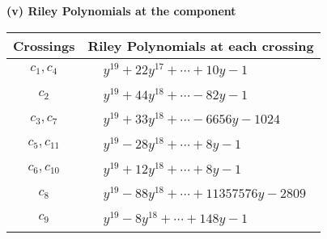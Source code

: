 \documentclass[1p]{elsarticle_modified}
\theoremstyle{definition}
\begin{document}
\newpage\renewcommand{\arraystretch}{1}
\flushleft \textbf{(v) Riley Polynomials at the component}\newline \\
\begin{tabular}{m{50pt}|m{274pt}}
Crossings & \hspace{64pt}Riley Polynomials at each crossing \\
\hline $$\begin{aligned}c_{1},c_{4}\end{aligned}$$&$\begin{aligned}
&y^{19}+22 y^{17}+\cdots+10 y-1
\end{aligned}$\\
\hline $$\begin{aligned}c_{2}\end{aligned}$$&$\begin{aligned}
&y^{19}+44 y^{18}+\cdots-82 y-1
\end{aligned}$\\
\hline $$\begin{aligned}c_{3},c_{7}\end{aligned}$$&$\begin{aligned}
&y^{19}+33 y^{18}+\cdots-6656 y-1024
\end{aligned}$\\
\hline $$\begin{aligned}c_{5},c_{11}\end{aligned}$$&$\begin{aligned}
&y^{19}-28 y^{18}+\cdots+8 y-1
\end{aligned}$\\
\hline $$\begin{aligned}c_{6},c_{10}\end{aligned}$$&$\begin{aligned}
&y^{19}+12 y^{18}+\cdots+8 y-1
\end{aligned}$\\
\hline $$\begin{aligned}c_{8}\end{aligned}$$&$\begin{aligned}
&y^{19}-88 y^{18}+\cdots+11357576 y-2809
\end{aligned}$\\
\hline $$\begin{aligned}c_{9}\end{aligned}$$&$\begin{aligned}
&y^{19}-8 y^{18}+\cdots+148 y-1
\end{aligned}$\\
\hline
\end{tabular}\\~\\
\end{document}
